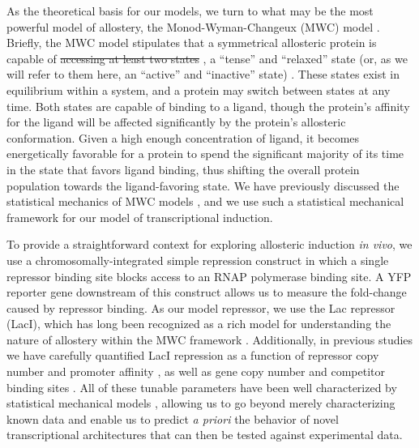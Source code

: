 As the theoretical basis for our models, we turn to what may be the most
powerful  model of allostery, the Monod-Wyman-Changeux (MWC) model
\cite{MONOD1965}.  Briefly,
the MWC model stipulates that a symmetrical allosteric protein is capable of
\sout{accessing at least two states} , a ``tense'' and ``relaxed'' state (or, as we will
refer to them here, an ``active'' and ``inactive'' state) . These states exist in
equilibrium within a system, and a protein may switch between states at any
time. Both states are capable of binding to a ligand, though the protein's
affinity for the ligand will be affected significantly by the protein's
allosteric conformation. Given a high enough concentration of ligand, it becomes
energetically favorable for a protein to spend the significant majority of its
time in the state that favors ligand binding, thus shifting the overall protein
population towards the ligand-favoring state. We have previously discussed the
statistical mechanics of MWC models \cite{Marzen2013}, and we use such a
statistical mechanical framework for our model of transcriptional induction.
 

 To provide a straightforward context for exploring allosteric induction
\textit{in vivo}, we use a chromosomally-integrated simple repression construct
in which a single repressor binding site blocks access to an RNAP polymerase
binding site. A YFP reporter gene downstream of this construct allows us to
measure the fold-change caused by repressor binding. As our model repressor, we
use the Lac repressor (LacI), which has long been recognized as a rich model 
for understanding the nature of allostery within the MWC framework
\cite{Daly1986, Dunaway1980, Meyer2013, Daber2007, Daber2009,
	Muller-Hartmann1996, OGorman1980, Sharp2011, Taraban2008, Wilson2007}.
Additionally, in previous studies we have carefully quantified LacI repression
as a function of repressor copy number and promoter affinity \cite{Garcia2011},
as well as gene copy number and competitor binding sites \cite{Weinert2014}. All
of these tunable parameters have been well characterized by statistical
mechanical models \cite{Bintu2005a, Bintu2005b}, allowing us to go beyond merely
characterizing known data and enable us to predict \textit{a priori} the
behavior of novel transcriptional architectures that can then be tested against
experimental data. 

